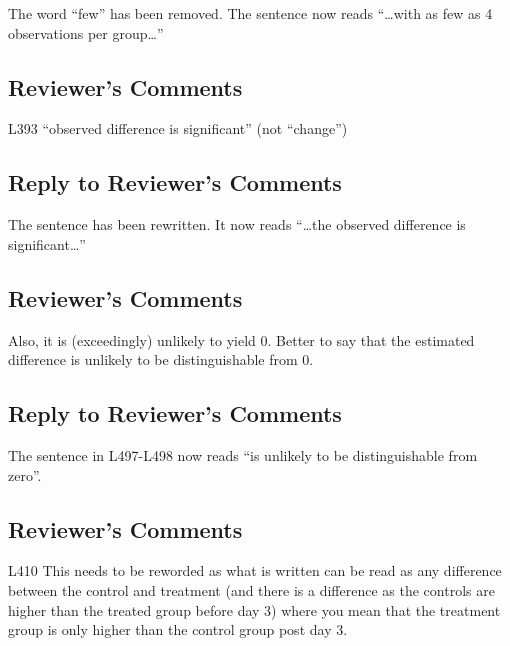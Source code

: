 \documentclass[
]{article}
\begin{document}
The word ``few'' has been removed. The sentence now reads ``\ldots with as few as 4 observations per group\ldots{}''

\hypertarget{reviewers-comments-34}{%
\subsection{Reviewer's Comments}\label{reviewers-comments-34}}

L393 ``observed difference is significant'' (not ``change'')

\hypertarget{section-35}{%
\subsection{\texorpdfstring{\textcolor{reviewersblue} {Reply to Reviewer's Comments}}{}}\label{section-35}}

The sentence has been rewritten. It now reads ``\ldots the observed difference is significant\ldots{}''

\hypertarget{reviewers-comments-35}{%
\subsection{Reviewer's Comments}\label{reviewers-comments-35}}

Also, it is (exceedingly) unlikely to yield 0. Better to say that the estimated difference is unlikely to be distinguishable from 0.

\hypertarget{section-36}{%
\subsection{\texorpdfstring{\textcolor{reviewersblue} {Reply to Reviewer's Comments}}{}}\label{section-36}}

The sentence in L497-L498 now reads ``is unlikely to be distinguishable from zero''.

\hypertarget{reviewers-comments-36}{%
\subsection{Reviewer's Comments}\label{reviewers-comments-36}}

L410 This needs to be reworded as what is written can be read as any difference between the control and treatment (and there is a difference as the controls are higher than the treated group before day 3) where you mean that the treatment group is only higher than the control group post day 3.
\end{document}
